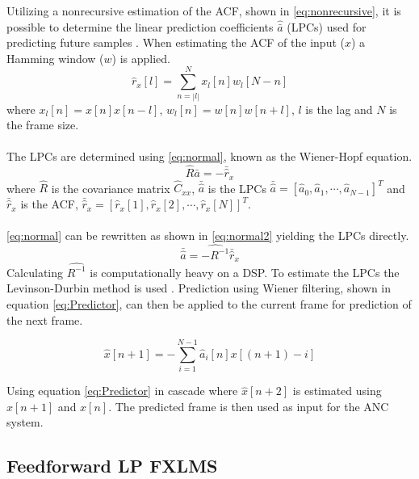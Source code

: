 Utilizing a nonrecursive estimation of the ACF, shown in \autoref{eq:nonrecursive}, it is possible to determine the linear prediction coefficients $\hat{\bar{a}}$ (LPCs) used for predicting future samples \cite{LinearPrediction}. When estimating the ACF of the input ($x$) a Hamming window ($w$) is applied.
\begin{equation}\label{eq:nonrecursive}
\hat{r}_x[l] = \sum^{N}_{n=\left| l\right|} x_l[n]w_l[N-n]
\end{equation}
where $x_l[n]=x[n]x[n-l]$, $w_l[n]=w[n]w[n+l]$, $l$ is the lag and $N$ is the frame size.
\\\\
The LPCs are determined using \autoref{eq:normal}, known as the Wiener-Hopf equation.
\begin{equation}\label{eq:normal}
\hat{R}  \bar{a} = -\bar{\hat{r}}_x
\end{equation}
where $\hat{R}$ is the covariance matrix $\hat{C}_{xx}$, $\bar{\hat{a}}$ is the LPCs $\bar{\hat{a}} = [\hat{a}_0 , \hat{a}_1, \cdots, \hat{a}_{N-1}]^T$ and $\bar{\hat{r}}_x$ is the ACF, $\bar{\hat{r}}_x = [\hat{r}_x[1] , \hat{r}_x[2], \cdots, \hat{r}_x[N]]^T$.
\\\\
\autoref{eq:normal} can be rewritten as shown in \autoref{eq:normal2} yielding the LPCs directly.  
 \begin{equation}\label{eq:normal2}
\bar{\hat{a}} = \hat{-R^{-1}} \bar{\hat{r}}_x
\end{equation}
Calculating $\hat{R^{-1}}$ is computationally heavy on a DSP. To estimate the LPCs the Levinson-Durbin method is used \cite{LinearPrediction}. Prediction using Wiener filtering, shown in equation \ref{eq:Predictor}, can then be applied to the current frame for prediction of the next frame. 

\begin{equation}\label{eq:Predictor}
\hat{x}[n+1] =- \sum^{N-1}_{i=1}\hat{a}_i[n]x[(n+1)-i]
\end{equation}

Using equation \ref{eq:Predictor} in cascade where $\hat{x}[n+2]$ is estimated using $\hat{x}[n+1]$ and $x[n]$. The predicted frame is then used as input for the ANC system.

\subsection{Feedforward LP FXLMS}

